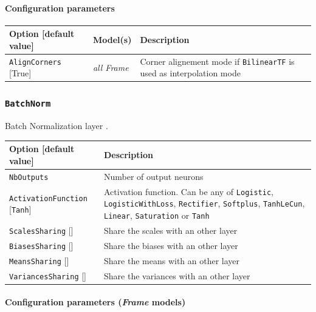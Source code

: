 \documentclass[a4paper,11pt,oneside]{article}
\begin{document}
\paragraph{Configuration parameters}

\begin{center}
 \begin{longtable}{| p{4cm} | p{3cm} | p{9cm} | }
 \hline
 Option [default value] & Model(s) & Description\\
 \hline\hline
  \lstinline!AlignCorners! [True] & \emph{all Frame} & Corner alignement mode if \lstinline!BilinearTF! is used as interpolation mode \\
 \hline
\end{longtable}
\end{center}


\subsubsection{\texorpdfstring{%
\lstinline[basicstyle=\ttfamily\bfseries]!BatchNorm!}{BatchNorm}}
Batch Normalization layer \citep{Ioffe2015}.

\begin{center}
 \begin{longtable}{| p{5cm} | p{10cm} | }
 \hline
 Option [default value] & Description\\
 \hline\hline
  \cellcolor{requiredcolor}\lstinline!NbOutputs! & Number of output neurons \\
  \lstinline!ActivationFunction! [\lstinline!Tanh!] & Activation function.
  Can be any of \lstinline!Logistic!,  \lstinline!LogisticWithLoss!,
  \lstinline!Rectifier!, \lstinline!Softplus!, \lstinline!TanhLeCun!,
  \lstinline!Linear!, \lstinline!Saturation! or \lstinline!Tanh! \\
  \lstinline!ScalesSharing! [] & Share the scales with an other layer \\
  \lstinline!BiasesSharing! [] & Share the biases with an other layer \\
  \lstinline!MeansSharing! [] & Share the means with an other layer \\
  \lstinline!VariancesSharing! [] & Share the variances with an other layer \\
  \hline
\end{longtable}
\end{center}

\paragraph{Configuration parameters (\emph{Frame} models)}
\end{document}
